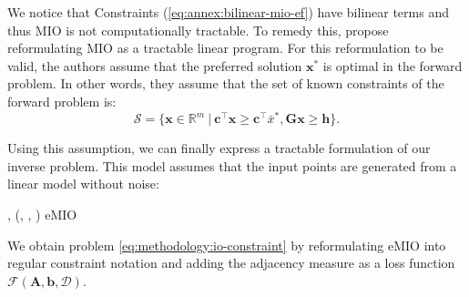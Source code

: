 We notice that Constraints (\ref{eq:annex:bilinear-mio-ef}) have bilinear terms and thus MIO is not computationally tractable. To remedy this, \cite{ghobadiInferringLinearFeasible2021} propose reformulating MIO as a tractable linear program. For this reformulation to be valid, the authors assume that the preferred solution $\bm{x}^*$ is optimal in the forward problem. In other words, they assume that the set of known constraints of the forward problem is:
$$\mathcal{S} = \{\bm{x} \in \mathbb{R}^m \:|\: \bm{c}^\top \bm{x} \geq \bm{c}^\top \bar{x}^*, \bm{Gx}\geq \bm{h}\}.$$

Using this assumption, we can finally express a tractable formulation of our inverse problem. This model assumes that the input points are generated from a linear model without noise:

\begin{minie}
    {, }
    {(, , )}
    {eMIO}
    {}
\end{minie}

We obtain problem \ref{eq:methodology:io-constraint} by reformulating eMIO into regular constraint notation and adding the adjacency measure as a loss function $\mathcal{F}(\bm{A}, \bm{b}, \mathcal{D})$.

%
